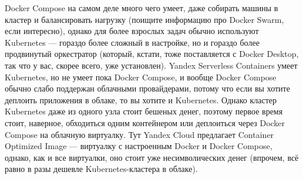 \documentclass{../../text-style}
\begin{document}
Docker Compose на самом деле много чего умеет, даже собирать машины в кластер и балансировать нагрузку (поищите информацию про Docker Swarm, если интересно), однако для более взрослых задач обычно используют Kubernetes --- гораздо более сложный в настройке, но и гораздо более продвинутый оркестратор (который, кстати, тоже поставляется с Docker Desktop, так что у вас, скорее всего, уже установлен). Yandex Serverless Containers умеет Kubernetes, но не умеет пока Docker Compose, и вообще Docker Compose обычно слабо поддержан облачными провайдерами, потому что если вы хотите деплоить приложения в облаке, то вы хотите и Kubernetes. Однако кластер Kubernetes даже из одного узла стоит бешеных денег, поэтому первое время стоит, наверное, обходиться одним контейнером или деплоиться через Docker  Compose на облачную виртуалку. Тут Yandex Cloud предлагает Container Optimized Image --- виртуалку с настроенным Docker и Docker Compose, однако, как и все виртуалки, оно стоит уже несимволических денег (впрочем, всё равно в разы дешевле Kubernetes-кластера в облаке).
\end{document}
